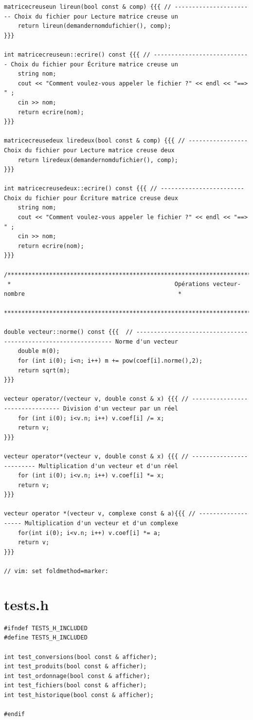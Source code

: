 \documentclass[a4paper]{article}
\begin{document}
\begin{verbatim}
matricecreuseun lireun(bool const & comp) {{{ // ----------------------- Choix du fichier pour Lecture matrice creuse un
    return lireun(demandernomdufichier(), comp);
}}}

int matricecreuseun::ecrire() const {{{ // ---------------------------- Choix du fichier pour Écriture matrice creuse un
    string nom;
    cout << "Comment voulez-vous appeler le fichier ?" << endl << "==> " ;
    cin >> nom;
    return ecrire(nom);
}}}

matricecreusedeux liredeux(bool const & comp) {{{ // ----------------- Choix du fichier pour Lecture matrice creuse deux
    return liredeux(demandernomdufichier(), comp);
}}}

int matricecreusedeux::ecrire() const {{{ // ------------------------ Choix du fichier pour Écriture matrice creuse deux
    string nom;
    cout << "Comment voulez-vous appeler le fichier ?" << endl << "==> " ;
    cin >> nom;
    return ecrire(nom);
}}}

/**********************************************************************************************************************
 *                                               Opérations vecteur-nombre                                            *
 **********************************************************************************************************************/

double vecteur::norme() const {{{  // --------------------------------------------------------------- Norme d'un vecteur
    double m(0);
	for (int i(0); i<n; i++) m += pow(coef[i].norme(),2);
    return sqrt(m);
}}}

vecteur operator/(vecteur v, double const & x) {{{ // -------------------------------- Division d'un vecteur par un réel
	for (int i(0); i<v.n; i++) v.coef[i] /= x;
    return v;
}}}

vecteur operator*(vecteur v, double const & x) {{{ // ------------------------- Multiplication d'un vecteur et d'un réel
	for (int i(0); i<v.n; i++) v.coef[i] *= x;
    return v;
}}}

vecteur operator *(vecteur v, complexe const & a){{{ // ------------------- Multiplication d'un vecteur et d'un complexe
    for(int i(0); i<v.n; i++) v.coef[i] *= a;
    return v;
}}}

// vim: set foldmethod=marker:
\end{verbatim}

\section{tests.h}
\begin{verbatim}
#ifndef TESTS_H_INCLUDED
#define TESTS_H_INCLUDED

int test_conversions(bool const & afficher);
int test_produits(bool const & afficher);
int test_ordonnage(bool const & afficher);
int test_fichiers(bool const & afficher);
int test_historique(bool const & afficher);

#endif
\end{verbatim}
\end{document}
